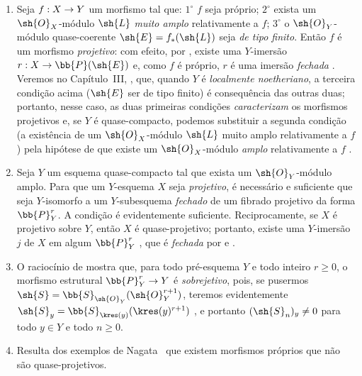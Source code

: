 \documentclass[oneside,10pt]{amsart}
\makeatletter
\renewcommand{\geq}{\geqslant}
\newcommand{\ega@arrow}[2]{\mathchoice{#1}{#2}{#2}{#2}}
\renewcommand{\to}{\ega@arrow{\longrightarrow}{\rightarrow}}
\newcommand{\oldpage}[2][]{\marginnote{\normalfont\footnotesize\textbf{#1}~|~#2}\ignorespaces}
\let\EGAOriginalLabel\label
\renewcommand{\label}[1]{\phantomsection\EGAOriginalLabel{#1}}
\makeatother
\begin{document}
\begin{remark}[5.5.4]
\label{II.5.5.4}
\medskip\noindent
\begin{enumerate}
  \item[(i)] Seja $f:X\to Y$ um morfismo tal que: $1^\circ$ $f$ seja próprio; $2^\circ$ exista um $\sh{O}_X$-módulo $\sh{L}$ \emph{muito amplo} relativamente a $f$; $3^\circ$ o $\sh{O}_Y$-módulo quase-coerente $\sh{E}=f_*(\sh{L})$ seja \emph{de tipo finito}.
    Então $f$ é um morfismo \emph{projetivo}: com efeito, por , existe uma $Y$-imersão $r:X\to\bb{P}(\sh{E})$ e, como $f$ é próprio, $r$ é uma imersão \emph{fechada} .
    Veremos no Capítulo~III, , que, quando $Y$ é \emph{localmente noetheriano}, a terceira condição acima ($\sh{E}$ ser de tipo finito) é consequência das outras duas; portanto, nesse caso, as duas primeiras condições \emph{caracterizam} os morfismos projetivos e, se $Y$ é quase-compacto, podemos substituir a segunda condição (a existência de um $\sh{O}_X$-módulo $\sh{L}$ muito amplo relativamente a $f$) pela hipótese de que existe um $\sh{O}_X$-módulo \emph{amplo} relativamente a $f$ .
  \item[(ii)] Seja $Y$ um esquema quase-compacto tal que exista um $\sh{O}_Y$-módulo amplo.
    Para que um $Y$-esquema $X$ seja \emph{projetivo}, é necessário e suficiente que seja $Y$-isomorfo a um $Y$-subesquema \emph{fechado} de um fibrado projetivo da forma $\bb{P}_Y^r$.
    A condição é evidentemente suficiente.
\oldpage[II]{105}
Reciprocamente, se $X$ é projetivo sobre $Y$, então $X$ é quase-projetivo; portanto, existe uma $Y$-imersão $j$ de $X$ em algum $\bb{P}_Y^r$ , que é \emph{fechada} por  e .
  \item[\rm{(iii)}] O raciocínio de  mostra que, para todo pré-esquema $Y$ e todo inteiro $r\geq0$, o morfismo estrutural $\bb{P}_Y^r\to Y$ é \emph{sobrejetivo}, pois, se pusermos $\sh{S}=\bb{S}_{\sh{O}_Y}(\sh{O}_Y^{r+1})$, teremos evidentemente $\sh{S}_y=\bb{S}_{\kres(y)}(\kres(y)^{r+1})$ , e portanto $(\sh{S}_n)_y\neq0$ para todo $y\in Y$ e todo $n\geq0$.
  \item[\rm{(iv)}] Resulta dos exemplos de Nagata~\cite{II-26} que existem morfismos próprios que não são quase-projetivos.
\end{enumerate}
\end{remark}
\end{document}
